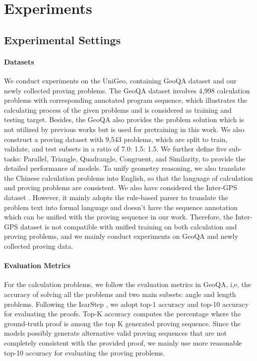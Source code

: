 \documentclass[11pt]{article}
\begin{document}
\section{Experiments}

\subsection{Experimental Settings}

\paragraph{Datasets}
We conduct experiments on the UniGeo, containing GeoQA \cite{chen2021geoqa} dataset and our newly collected proving problems. The GeoQA dataset involves 4,998 calculation problems with corresponding annotated program sequence, which illustrates the calculating process of the given problems and is considered as training and testing target. Besides, the GeoQA also provides the problem solution which is not utilized by previous works but is used for pretraining in this work.
We also construct a proving dataset with 9,543 problems, which are split to train, validate, and test subsets in a ratio of 7.0: 1.5: 1.5. We further define five sub-tasks: Parallel, Triangle, Quadrangle, Congruent, and Similarity, to provide the detailed performance of models.
To unify geometry reasoning, we also translate the Chinese calculation problems into English, so that the language of calculation and proving problems are consistent.
We also have considered the Inter-GPS dataset \cite{lu2021inter}. However, it mainly adopts the rule-based parser to translate the problem text into formal language and doesn't have the sequence annotation which can be unified with the proving sequence in our work. Therefore, the Inter-GPS dataset is not compatible with unified training on both calculation and proving problems, and we mainly conduct experiments on GeoQA and newly collected proving data.

\paragraph{Evaluation Metrics}
For the calculation problems, we follow the evaluation metrics in GeoQA, i,e, the accuracy of solving all the problems and two main subsets: angle and length problems. 
Following the IsarStep \cite{li2020isarstep}, we adopt top-1 accuracy and top-10 accuracy for evaluating the proofs. 
Top-K accuracy computes the percentage where the ground-truth proof is among the top K generated proving sequence.
Since the models possibly generate alternative valid proving sequences that are not completely consistent with the provided proof, we mainly use more reasonable top-10 accuracy for evaluating the proving problems. 
\end{document}
